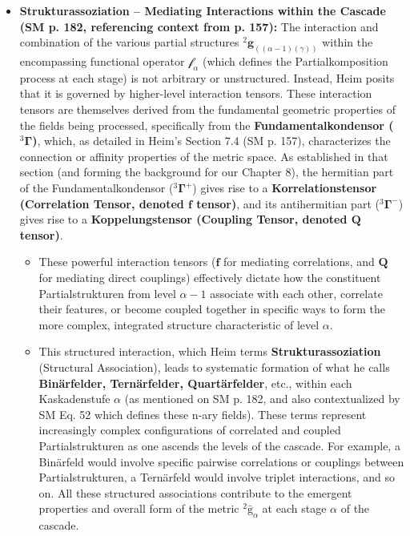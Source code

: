 \documentclass[12pt]{article}
\newcommand{\kompositionsfeld}{{}^2\bar{\mathrm{g}}}
\newcommand{\partialstruktur}[1]{{}^2\mathbf{g}_{(#1)}}
\newcommand{\fundamentalkondensor}{{}^3\bm{\Gamma}}
\newcommand{\korrelationstensor}{\mathbf{f}}
\newcommand{\koppelungstensor}{\mathbf{Q}}
\newcommand{\kaskadenstufe}{\alpha}
\begin{document}
\begin{itemize}
    \item \textbf{Strukturassoziation – Mediating Interactions within the Cascade (SM p. 182, referencing context from p. 157):}
    The interaction and combination of the various partial structures \( \partialstruktur{(\alpha-1)(\gamma)} \) within the encompassing functional operator \( \mathcal{f}_\alpha \) (which defines the Partialkomposition process at each stage) is not arbitrary or unstructured. Instead, Heim posits that it is governed by higher-level interaction tensors. These interaction tensors are themselves derived from the fundamental geometric properties of the fields being processed, specifically from the \textbf{Fundamentalkondensor (\( \fundamentalkondensor \))}, which, as detailed in Heim's Section 7.4 (SM p. 157), characterizes the connection or affinity properties of the metric space. As established in that section (and forming the background for our Chapter 8), the hermitian part of the Fundamentalkondensor (\( \fundamentalkondensor^+ \)) gives rise to a \textbf{Korrelationstensor (Correlation Tensor, denoted \( \korrelationstensor \) tensor)}, and its antihermitian part (\( \fundamentalkondensor^- \)) gives rise to a \textbf{Koppelungstensor (Coupling Tensor, denoted \( \koppelungstensor \) tensor)}.
    \begin{itemize}
        \item These powerful interaction tensors (\( \korrelationstensor \) for mediating correlations, and \( \koppelungstensor \) for mediating direct couplings) effectively dictate how the constituent Partialstrukturen from level \( \alpha-1 \) associate with each other, correlate their features, or become coupled together in specific ways to form the more complex, integrated structure characteristic of level \( \alpha \).
        \item This structured interaction, which Heim terms \textbf{Strukturassoziation} (Structural Association), leads to systematic formation of what he calls \textbf{Binärfelder, Ternärfelder, Quartärfelder}, etc., within each Kaskadenstufe \( \kaskadenstufe \) (as mentioned on SM p. 182, and also contextualized by SM Eq. 52 which defines these n-ary fields). These terms represent increasingly complex configurations of correlated and coupled Partialstrukturen as one ascends the levels of the cascade. For example, a Binärfeld would involve specific pairwise correlations or couplings between Partialstrukturen, a Ternärfeld would involve triplet interactions, and so on. All these structured associations contribute to the emergent properties and overall form of the metric \( \kompositionsfeld_\alpha \) at each stage \( \alpha \) of the cascade.
    \end{itemize}
\end{itemize}
\end{document}
